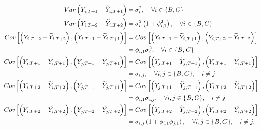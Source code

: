 \documentclass[a4paper,11pt]{article}
\theoremstyle{definition}
\begin{document}
\begin{align*}\allowdisplaybreaks[2]
	Var\left(Y_{i,T+1}-\widetilde{Y}_{i,T+1}\right)                                                            & = \sigma_i^2, \quad \forall i \in \{B, C\}                                                                    \\
	Var\left(Y_{i,T+2}-\widetilde{Y}_{i,T+2}\right)                                                            & = \sigma_i^2\left(1+\phi_{i,1}^2\right), \quad \forall i \in \{B, C\}                                         \\
	Cov\left[\left(Y_{i,T+2}-\widetilde{Y}_{i,T+2}\right), \left(Y_{i,T+1}-\widetilde{Y}_{i,T+1}\right)\right] & = 	Cov\left[\left(Y_{i,T+1}-\widetilde{Y}_{i,T+1}\right), \left(Y_{i,T+2}-\widetilde{Y}_{i,T+2}\right)\right] \\
	                                                                                                           & = \phi_{i, 1}\sigma_{i}^2, \quad \forall i \in \{B, C\}                                                       \\
	Cov\left[\left(Y_{i,T+1}-\widetilde{Y}_{i,T+1}\right), \left(Y_{j,T+1}-\widetilde{Y}_{j,T+1}\right)\right] & = 	Cov\left[\left(Y_{j,T+1}-\widetilde{Y}_{j,T+1}\right), \left(Y_{i,T+1}-\widetilde{Y}_{i,T+1}\right)\right] \\
	                                                                                                           & = \sigma_{i, j}, \quad \forall i,j \in \{B, C\}, \quad i\neq j                                                \\
	Cov\left[\left(Y_{i,T+2}-\widetilde{Y}_{i,T+2}\right), \left(Y_{j,T+1}-\widetilde{Y}_{j,T+1}\right)\right] & = 	Cov\left[\left(Y_{j,T+1}-\widetilde{Y}_{j,T+1}\right), \left(Y_{i,T+2}-\widetilde{Y}_{i,T+2}\right)\right] \\
	                                                                                                           & = \phi_{i,1}\sigma_{i, j}, \quad \forall i,j \in \{B, C\}, \quad i\neq j                                      \\
	Cov\left[\left(Y_{i,T+2}-\widetilde{Y}_{i,T+2}\right), \left(Y_{j,T+2}-\widetilde{Y}_{j,T+2}\right)\right] & = 	Cov\left[\left(Y_{j,T+2}-\widetilde{Y}_{j,T+2}\right), \left(Y_{i,T+2}-\widetilde{Y}_{i,T+2}\right)\right] \\
	                                                                                                           & = \sigma_{i, j}\left(1+\phi_{i,1}\phi_{j,1}\right), \quad \forall i,j \in \{B, C\}, \quad i\neq j.
\end{align*}
\end{document}
